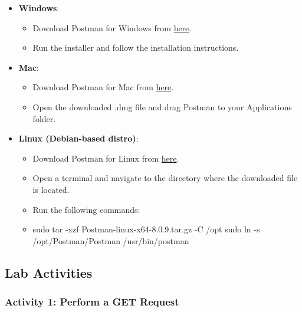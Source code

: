 \documentclass[11pt,a4paper]{article}
\providecommand{\tightlist}{%
  \setlength{\itemsep}{0pt}\setlength{\parskip}{0pt}}
\begin{document}
\begin{itemize}
\tightlist
\item
  \textbf{Windows}:

  \begin{itemize}
  \tightlist
  \item
    Download Postman for Windows from
    \href{https://www.postman.com/downloads/}{here}.
  \item
    Run the installer and follow the installation instructions.
  \end{itemize}
\item
  \textbf{Mac}:

  \begin{itemize}
  \tightlist
  \item
    Download Postman for Mac from
    \href{https://www.postman.com/downloads/}{here}.
  \item
    Open the downloaded .dmg file and drag Postman to your Applications
    folder.
  \end{itemize}
\item
  \textbf{Linux (Debian-based distro)}:

  \begin{itemize}
  \item
    Download Postman for Linux from
    \href{https://www.postman.com/downloads/}{here}.
  \item
    Open a terminal and navigate to the directory where the downloaded
    file is located.
  \item
    Run the following commands:
  \end{itemize}

  \begin{itemize}
  \tightlist
  \item
    sudo tar -xzf Postman-linux-x64-8.0.9.tar.gz -C /opt sudo ln -s
    /opt/Postman/Postman /usr/bin/postman
  \end{itemize}
\end{itemize}

\subsection{Lab Activities}\label{lab-activities}

\subsubsection{Activity 1: Perform a GET
Request}\label{activity-1-perform-a-get-request}
\end{document}
